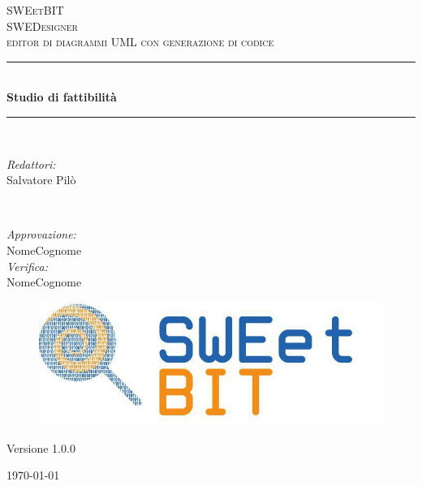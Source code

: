 \documentclass[a4paper]{report}
\begin{document}
  \begin{titlepage}
		\newcommand{\HRule}{\rule{\linewidth}{0.5mm}}
		\center

		\textsc{\LARGE SWEetBIT}\\[1.5cm]
		\textsc{\Large SWEDesigner}\\[0.5cm]
		\textsc{\large  editor di diagrammi UML con generazione di codice}\\[0.5cm]

		\HRule \\[0.4cm]
		{ \huge \bfseries Studio di fattibilità}\\[0.4cm]
		\HRule \\[1.5cm]

		\begin{minipage}{0.4\textwidth}
			\begin{flushleft} \large
				\emph{Redattori:}\\
				Salvatore Pilò \\
			\end{flushleft}
		\end{minipage}
		~
		\begin{minipage}{0.4\textwidth}
			\begin{flushright} \large
				\emph{Approvazione:} \\
				NomeCognome \\
				\emph{Verifica:} \\
				NomeCognome \\
			\end{flushright}
		\end{minipage}

		\begin{figure}[H]
			\centering
			\includegraphics[scale=0.8]{sweet.png}
		\end{figure}
		\begin{center}
			Versione 1.0.0
		\end{center}
		{\large \today}\\[3cm]
		\vfill
	\end{titlepage}
\end{document}
